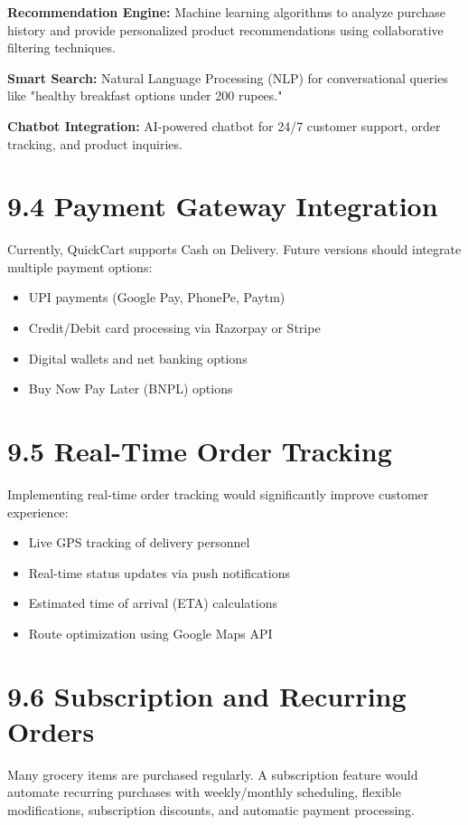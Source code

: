 \documentclass[12pt,a4paper]{report}
\begin{document}
\textbf{Recommendation Engine:} Machine learning algorithms to analyze purchase history and provide personalized product recommendations using collaborative filtering techniques.

\textbf{Smart Search:} Natural Language Processing (NLP) for conversational queries like "healthy breakfast options under 200 rupees."

\textbf{Chatbot Integration:} AI-powered chatbot for 24/7 customer support, order tracking, and product inquiries.

\section*{9.4 Payment Gateway Integration}

Currently, QuickCart supports Cash on Delivery. Future versions should integrate multiple payment options:
\begin{itemize}
    \item UPI payments (Google Pay, PhonePe, Paytm)
    \item Credit/Debit card processing via Razorpay or Stripe
    \item Digital wallets and net banking options
    \item Buy Now Pay Later (BNPL) options
\end{itemize}

\section*{9.5 Real-Time Order Tracking}

Implementing real-time order tracking would significantly improve customer experience:
\begin{itemize}
    \item Live GPS tracking of delivery personnel
    \item Real-time status updates via push notifications
    \item Estimated time of arrival (ETA) calculations
    \item Route optimization using Google Maps API
\end{itemize}

\section*{9.6 Subscription and Recurring Orders}

Many grocery items are purchased regularly. A subscription feature would automate recurring purchases with weekly/monthly scheduling, flexible modifications, subscription discounts, and automatic payment processing.
\end{document}
